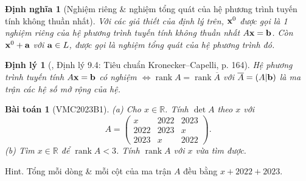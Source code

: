 \documentclass{article}
\newtheorem{baitoan}{Bài toán}
\newtheorem{dinhly}{Định lý}
\newtheorem{dinhnghia}{Định nghĩa}
\begin{document}
\begin{dinhnghia}[Nghiệm riêng \& nghiệm tổng quát của hệ phương trình tuyến tính không thuần nhất]
	Với các giả thiết của định lý trên, ${\bf x}^0$ được gọi là 1 \emph{nghiệm riêng} của hệ phương trình tuyến tính không thuần nhất $A{\bf x} = {\bf b}$. Còn ${\bf x}^0 + {\bf a}$ với ${\bf a}\in L$, được gọi là \emph{nghiệm tổng quát} của hệ phương trình đó.
\end{dinhnghia}

\begin{dinhly}[\cite{Hung_linear_algebra}, Định lý 9.4: Tiêu chuẩn Kronecker--Capelli, p. 164]
	Hệ phương trình tuyến tính $A{\bf x} = {\bf b}$ có nghiệm $\Leftrightarrow\operatorname{rank}A = \operatorname{rank}\overline{A}$ với $\overline{A} = (A|{\bf b})$ là ma trận các hệ số mở rộng của hệ.
\end{dinhly}

\begin{baitoan}[VMC2023B1]
	(a) Cho $x\in\mathbb{R}$. Tính $\det A$ theo $x$ với
	\begin{equation*}
		A = \begin{pmatrix}
			x & 2022 & 2023\\2022 & 2023 & x\\2023 & x & 2022
		\end{pmatrix}.
	\end{equation*}
	(b) Tìm $x\in\mathbb{R}$ để $\operatorname{rank}A < 3$. Tính $\operatorname{rank}A$ với $x$ vừa tìm được.
\end{baitoan}
{\sf Hint.} Tổng mỗi dòng \& mỗi cột của ma trận $A$ đều bằng $x + 2022 + 2023$.
\end{document}
